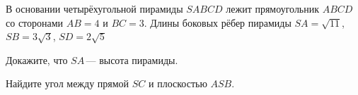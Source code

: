 \begin{ex}
	\begin{condition}
		В основании четырёхугольной пирамиды \( SABCD \) лежит прямоугольник \( ABCD \) со сторонами \( AB = 4 \) и \( BC = 3 \). Длины боковых рёбер пирамиды \( SA = \sqrt{11} \), \( SB = 3\sqrt{3} \), \( SD = 2\sqrt{5} \)
		\begin{enumcols}[label=\asbuk*)]
			\item Докажите, что \( SA \) --- высота пирамиды.
			\item Найдите угол между прямой \( SC \) и плоскостью \( ASB \).
		\end{enumcols}
	\end{condition}
	\answer{\( 30\degree \)}
\end{ex}